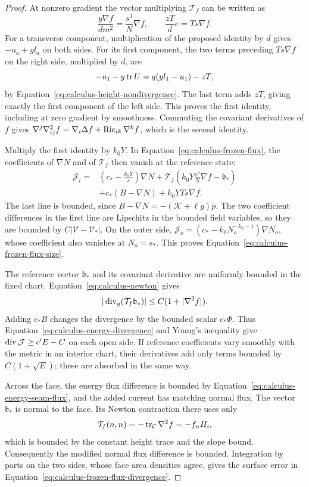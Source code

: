\begin{proof}
At nonzero gradient the vector multiplying $\mathcal T_f$ can be
written as
\[
 \frac{y\nabla f}{d m^2}=
       \frac{s^3}{N}\nabla f,
 \qquad \frac{zT}{d}e=Ts\nabla f.
\]
For a transverse component, multiplication of the proposed identity
by $d$ gives $-u_a+yl_a$ on both sides.
For its first component, the two terms preceding $Ts\nabla f$ on the
right side, multiplied by $d$, are
\[
 -u_1-y\operatorname{tr} U=q(yl_1-u_1)-zT,
\]
by Equation~\eqref{eq:calculus-height-nondivergence}.
The last term adds $zT$, giving exactly the first component of the
left side.  This proves the first identity, including at zero gradient
by smoothness.  Commuting the covariant derivatives of $f$ gives
$\nabla^j\nabla^2_{ij}f=\nabla_i\Delta f+\operatorname{Ric}_{ik}\nabla^kf$,
which is the second identity.

Multiply the first identity by $k_0Y$.  In
Equation~\eqref{eq:calculus-frozen-flux}, the coefficients of
$\nabla N$ and of $\mathcal T_f$ then vanish at the reference state:
\begin{align*}
 \mathcal J_i={}&
   \left(c_*-\frac{k_0Y}{s}\right)\nabla N
   +\mathcal T_f\left(k_0Y\frac{s^3}{N}\nabla f-\mathfrak b_*\right)\\
 &+c_*(B-\nabla N)+k_0YTs\nabla f.
\end{align*}
The last line is bounded, since
$B-\nabla N=-(\mathcal K+\ell g)p$.
The two coefficient differences in the first line are Lipschitz in
the bounded field variables, so they are bounded by
$C|\mathcal V-\mathcal V_*|$.
On the outer side,
$\mathcal J_o=(c_*-k_0N_o^{-k_0-1})\nabla N_o$,
whose coefficient also vanishes at $N_o=s_*$.
This proves Equation~\eqref{eq:calculus-frozen-flux-size}.

The reference vector $\mathfrak b_*$ and its covariant derivative are uniformly
bounded in the fixed chart.  Equation~\eqref{eq:calculus-newton} gives
\[
 |\operatorname{div}_g(\mathcal T_f\mathfrak b_*)|
 \le C(1+|\nabla^2f|).
\]
Adding $c_*B$ changes the divergence by the bounded scalar $c_*\Phi$.
Thus Equation~\eqref{eq:calculus-energy-divergence} and Young's
inequality give $\operatorname{div}\mathcal J\ge c'E-C$ on each open side.
If reference coefficients vary smoothly with the metric in an interior
chart, their derivatives add only terms bounded by $C(1+\sqrt E)$;
these are absorbed in the same way.

Across the face, the energy flux difference is bounded by
Equation~\eqref{eq:calculus-energy-seam-flux}, and the added current has
matching normal flux.  The vector $\mathfrak b_*$ is normal to the face.  Its
Newton contraction there uses only
\[
 \mathcal T_f(n,n)=-\operatorname{tr}_{\mathcal C}\nabla^2f=-f_nH_i,
\]
which is bounded by the constant height trace and the slope bound.
Consequently the modified normal flux difference is bounded.  Integration
by parts on the two sides, whose face area densities agree, gives
the surface error in
Equation~\eqref{eq:calculus-frozen-flux-divergence}.
\end{proof}
